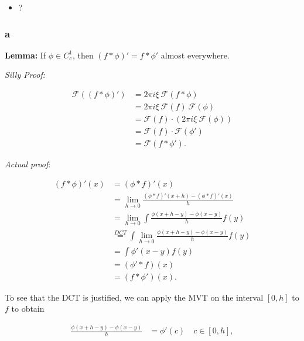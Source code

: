 \begin{solution}

\hfill

\begin{concept}

\hfill

\begin{itemize}
\tightlist
\item
  ?
\end{itemize}

\end{concept}

\hypertarget{a-3}{%
\subsubsection{a}\label{a-3}}

\textbf{Lemma:} If \(\phi \in C_c^1\), then
\((f \ast \phi)' = f \ast \phi'\) almost everywhere.

\emph{Silly Proof:}

\begin{align*}
\mathcal{F}(
    (f \ast \phi)'
 )
&= 2\pi i \xi ~\mathcal{F}(f\ast \phi) \\
&= 2\pi i \xi ~ \mathcal{F}(f) ~ \mathcal{F}(\phi) \\
&= \mathcal{F}(f) \cdot \left( 2\pi i \xi ~\mathcal{F}(\phi)\right) \\
&= \mathcal{F}(f) \cdot \mathcal{F}(\phi') \\
&= \mathcal{F}(f\ast \phi')
.\end{align*}

\emph{Actual proof}:

\begin{align*}
(f\ast \phi)'(x)
&= (\phi\ast f)'(x) \\
&= \lim_{h\to 0} \frac{(\phi\ast f)'(x+h) - (\phi\ast f)'(x)}{h} \\
&= \lim_{h\to 0} \int \frac{\phi(x + h - y) - \phi(x - y)}{h} f(y) \\
&\overset{DCT}=  \int \lim_{h\to 0} \frac{\phi(x + h - y) - \phi(x - y)}{h} f(y) \\
&= \int \phi'(x-y) f(y) \\
&= (\phi' \ast f)(x) \\
&= (f \ast \phi')(x)
.\end{align*}

To see that the DCT is justified, we can apply the MVT on the interval
\([0, h]\) to \(f\) to obtain

\begin{align*}
\frac{\phi(x + h - y) - \phi(x - y)}{h}
&= \phi'(c) \quad c\in [0, h]
,\end{align*}


\end{solution}
